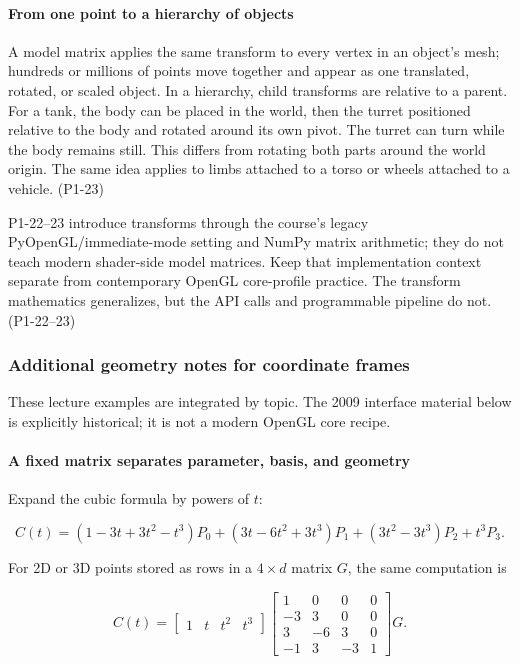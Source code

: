 \paragraph{From one point to a hierarchy of objects}\label{from-one-point-to-a-hierarchy-of-objects}

A model matrix applies the same transform to every vertex in an object's mesh; hundreds or millions of points move together and appear as one translated, rotated, or scaled object. In a hierarchy, child transforms are relative to a parent. For a tank, the body can be placed in the world, then the turret positioned relative to the body and rotated around its own pivot. The turret can turn while the body remains still. This differs from rotating both parts around the world origin. The same idea applies to limbs attached to a torso or wheels attached to a vehicle. (P1-23)

P1-22--23 introduce transforms through the course's legacy PyOpenGL/immediate-mode setting and NumPy matrix arithmetic; they do not teach modern shader-side model matrices. Keep that implementation context separate from contemporary OpenGL core-profile practice. The transform mathematics generalizes, but the API calls and programmable pipeline do not. (P1-22--23)

\subsubsection{Additional geometry notes for coordinate frames}\label{additional-geometry-notes-for-coordinate-frames}

These lecture examples are integrated by topic. The 2009 interface material below is explicitly historical; it is not a modern OpenGL core recipe.

\paragraph{A fixed matrix separates parameter, basis, and geometry}\label{a-fixed-matrix-separates-parameter-basis-and-geometry}

Expand the cubic formula by powers of \(t\):

\[
C(t)=(1-3t+3t^2-t^3)P_0+(3t-6t^2+3t^3)P_1+(3t^2-3t^3)P_2+t^3P_3.
\]

For 2D or 3D points stored as rows in a \(4\times d\) matrix \(G\), the same computation is

\[
C(t)=\begin{bmatrix}1&t&t^2&t^3\end{bmatrix}
\begin{bmatrix}1&0&0&0\\-3&3&0&0\\3&-6&3&0\\-1&3&-3&1\end{bmatrix}G.
\]

